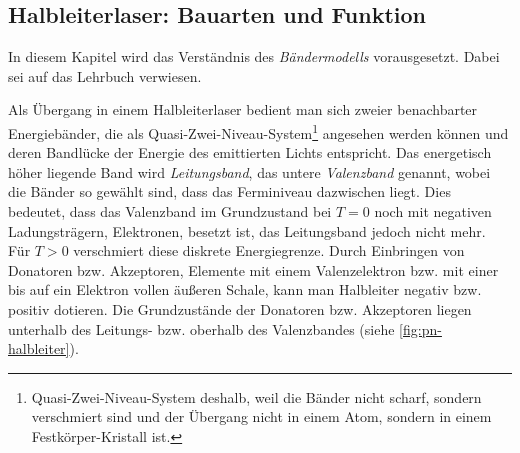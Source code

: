 \subsection{Halbleiterlaser: Bauarten und
Funktion}\label{subsec:halbleiterlaser}
In diesem Kapitel wird das Verständnis des \textit{Bändermodells} vorausgesetzt.
Dabei sei auf das Lehrbuch \cite{demtroeder:ex3} verwiesen.\par
Als Übergang in
einem Halbleiterlaser bedient man sich zweier benachbarter Energiebänder, die
als Quasi-Zwei-Niveau-System\footnote{Quasi-Zwei-Niveau-System deshalb, weil
die Bänder nicht scharf, sondern verschmiert sind und der Übergang nicht
in einem Atom, sondern in einem Festkörper-Kristall ist.} angesehen werden
können und deren Bandlücke der Energie des emittierten Lichts entspricht.
Das energetisch höher liegende Band wird \textit{Leitungsband}, das untere
\textit{Valenzband} genannt, wobei die Bänder so gewählt sind, dass das
Ferminiveau dazwischen liegt. Dies bedeutet, dass das Valenzband im Grundzustand
bei $T=0$ noch mit negativen Ladungsträgern, Elektronen, besetzt ist, das
Leitungsband jedoch nicht mehr. Für $T>0$ verschmiert diese diskrete
Energiegrenze. Durch Einbringen von Donatoren bzw.
Akzeptoren, Elemente mit einem Valenzelektron bzw. mit einer bis auf ein
Elektron vollen äußeren Schale, kann man Halbleiter negativ bzw. positiv
dotieren. Die Grundzustände der Donatoren bzw. Akzeptoren liegen unterhalb des
Leitungs- bzw. oberhalb des Valenzbandes (siehe
\ref{fig:pn-halbleiter}).
